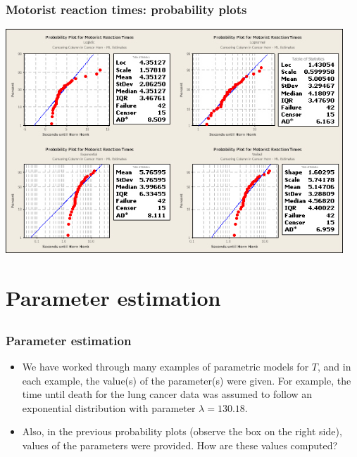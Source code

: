 \begin{frame}
\frametitle{Motorist reaction times: probability plots}
\includegraphics[width=0.95\textwidth]{Figures/prob_plots_motorist.jpg}
\end{frame}


\section[Parameter estimation]{Parameter estimation}
\subsection{}
\begin{frame}
\end{frame}

\begin{frame}
\frametitle{Parameter estimation}
\begin{itemize}
\item We have worked through many examples of parametric models for $T$, and in each example, the value(s) of the parameter(s) were given. For example, the time until death for the lung cancer data was assumed to follow an exponential distribution with parameter $\lambda=130.18$.

\item Also, in the previous probability plots (observe the box on the right side), values of the parameters were provided.  How are these values computed?
\end{itemize}
\vskip100pt
\end{frame}


